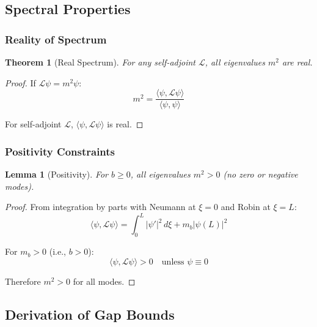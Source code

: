 \documentclass[11pt,a4paper]{article}
\newcommand{\mb}{m_b}
\theoremstyle{definition}
\theoremstyle{plain}
\newtheorem{theorem}{Theorem}[section]
\newtheorem{lemma}{Lemma}[section]
\theoremstyle{remark}
\begin{document}
\subsection{Spectral Properties}

\subsubsection{Reality of Spectrum}

\begin{theorem}[Real Spectrum]
\label{thm:real-spectrum}
For any self-adjoint $\mathcal{L}$, all eigenvalues $m^2$ are real.
\end{theorem}

\begin{proof}
If $\mathcal{L}\psi = m^2\psi$:
\begin{equation}
m^2 = \frac{\langle \psi, \mathcal{L}\psi \rangle}{\langle \psi, \psi \rangle}
\label{eq:rayleigh}
\end{equation}

For self-adjoint $\mathcal{L}$, $\langle \psi, \mathcal{L}\psi \rangle$ is real.
\end{proof}

\subsubsection{Positivity Constraints}

\begin{lemma}[Positivity]
\label{lem:positivity}
For $b \geq 0$, all eigenvalues $m^2 > 0$ (no zero or negative modes).
\end{lemma}

\begin{proof}
From integration by parts with Neumann at $\xi=0$ and Robin at $\xi=L$:
\begin{equation}
\langle \psi, \mathcal{L}\psi \rangle = \int_0^L |\psi'|^2 \, d\xi + \mb |\psi(L)|^2
\label{eq:positivity-1}
\end{equation}

For $\mb > 0$ (i.e., $b > 0$):
\begin{equation}
\langle \psi, \mathcal{L}\psi \rangle > 0 \quad \text{unless } \psi \equiv 0
\label{eq:positivity-2}
\end{equation}

Therefore $m^2 > 0$ for all modes.
\end{proof}

\subsection{Derivation of Gap Bounds}
\end{document}
